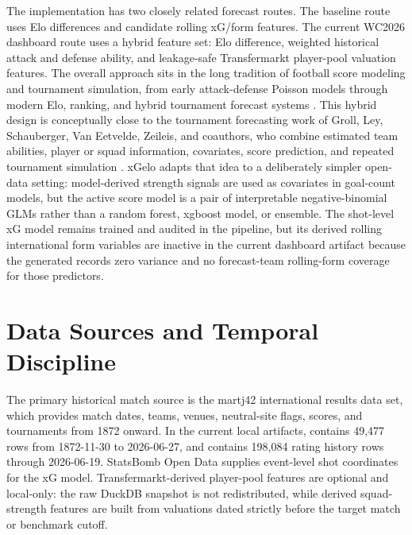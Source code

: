 \documentclass[11pt]{article}
\begin{document}
The implementation has two closely related forecast routes. The baseline route
uses Elo differences and candidate rolling xG/form features. The current
WC2026 dashboard route uses a hybrid feature set: Elo difference, weighted
historical attack and defense ability, and leakage-safe Transfermarkt
player-pool valuation features. The overall approach sits in the long
tradition of football score modeling and tournament simulation, from early
attack-defense Poisson models through modern Elo, ranking, and hybrid
tournament forecast systems
\cite{maher1982,dixoncoles1997,karlisntzoufras2003,gilchmuller2018,groll2018rf}.
This hybrid design is conceptually close to the
tournament forecasting work of Groll, Ley, Schauberger, Van Eetvelde, Zeileis,
and coauthors, who combine estimated team abilities, player or squad
information, covariates, score prediction, and repeated tournament simulation
\cite{groll2019wwc,groll2021euro2020,groll2024euro2024}. xGelo adapts that
idea to a deliberately simpler open-data setting: model-derived strength
signals are used as covariates in goal-count models, but the active score model
is a pair of interpretable negative-binomial GLMs rather than a random forest,
xgboost model, or ensemble. The shot-level xG model remains trained and audited
in the pipeline, but its derived rolling international form variables are
inactive in the current dashboard artifact because the generated
 records zero variance and no
forecast-team rolling-form coverage for those predictors.

\section{Data Sources and Temporal Discipline}

The primary historical match source is the martj42 international results data
set, which provides match dates, teams, venues, neutral-site flags, scores, and
tournaments from 1872 onward. In the current local artifacts,
 contains 49,477 rows from 1872-11-30 to
2026-06-27, and  contains 198,084 rating
history rows through 2026-06-19. StatsBomb Open Data supplies event-level shot
coordinates for the xG model. Transfermarkt-derived player-pool features are
optional and local-only: the raw DuckDB snapshot is not redistributed, while
derived squad-strength features are built from valuations dated strictly before
the target match or benchmark cutoff.
\end{document}
